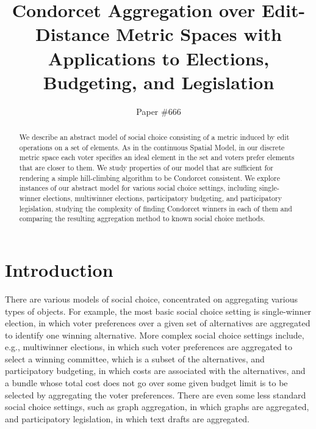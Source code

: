 \documentclass[sigconf]{aamas}  %
\begin{document}
\pagestyle{plain}


\title{Condorcet Aggregation over Edit-Distance Metric Spaces with Applications to Elections, Budgeting, and Legislation}


\author{
  Paper $\#666$
}


\begin{abstract}
%
We describe an abstract model of social choice consisting of a metric induced by edit operations on a set of elements.  As in the continuous Spatial Model, in our discrete metric space each voter specifies an ideal element in the set and voters prefer elements that are closer to them.
We study properties of our model that are sufficient for rendering a simple hill-climbing algorithm to be Condorcet consistent.
We explore instances of our abstract model for various social choice settings, including single-winner elections, multiwinner elections, participatory budgeting, and participatory legislation, studying the complexity of finding Condorcet winners in each of them and comparing the resulting aggregation method to known social choice methods.
%
\end{abstract}




\maketitle


\section{Introduction}

There are various models of social choice,
concentrated on aggregating various types of objects.
For example, the most basic social choice setting is single-winner election, in which voter preferences over a given set of alternatives are aggregated to identify one winning alternative. More complex social choice settings include, e.g., multiwinner elections, in which such voter preferences are aggregated to select a winning committee, which is a subset of the alternatives, and participatory budgeting, in which costs are associated with the alternatives, and a bundle whose total cost does not go over some given budget limit is to be selected by aggregating the voter preferences.
There are even some less standard social choice settings, such as graph aggregation, in which graphs are aggregated, and participatory legislation, in which text drafts are aggregated.
\end{document}
